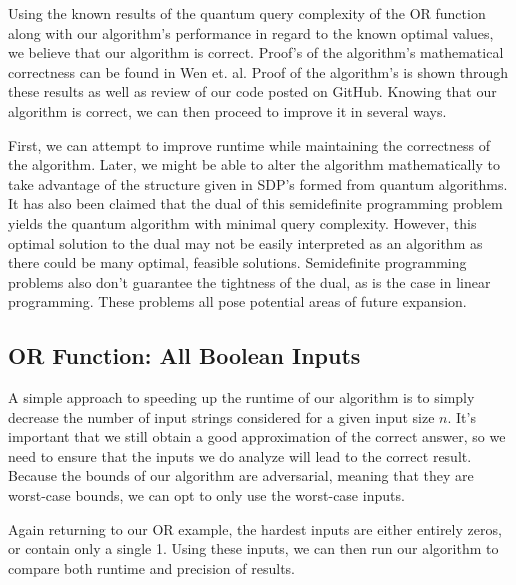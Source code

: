 Using the known results of the quantum query
complexity of the OR function along with our
algorithm's performance in regard to the known
optimal values, we believe that our algorithm is
correct. Proof's of the algorithm's mathematical
correctness can be found in Wen et. al. Proof of the
algorithm's is shown through these results as well as
review of our code posted on GitHub. Knowing that our
algorithm is correct, we can then proceed to improve
it in several ways. 

First, we can attempt to improve runtime while
maintaining the correctness of the algorithm. Later,
we might be able to alter the algorithm
mathematically to take advantage of the structure
given in SDP's formed from quantum algorithms. 
It has also been claimed that the dual of this semidefinite
programming problem yields the quantum algorithm with minimal query complexity.
However, this optimal solution to the dual may not be easily 
interpreted as an algorithm as there could be many optimal, feasible solutions. 
Semidefinite programming problems also don't guarantee the tightness of the dual,
as is the case in linear programming. 
These problems all pose potential areas of future expansion.

\subsection{OR Function: All Boolean Inputs}

A simple approach to speeding up the runtime of our
algorithm is to simply decrease the number of input
strings considered for a given input size $n$. It's
important that we still obtain a good approximation
of the correct answer, so we need to ensure that the
inputs we do analyze will lead to the correct result.
Because the bounds of our algorithm are adversarial,
meaning that they are worst-case bounds, we can opt
to only use the worst-case inputs.

Again returning to our OR example, the hardest inputs are
either entirely zeros, or contain only a single 1. 
Using these inputs, we can then run our algorithm to 
compare both runtime and precision of results.


